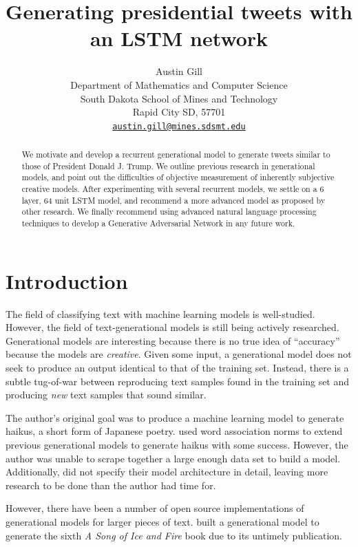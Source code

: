 \documentclass[letterpaper]{article}
\title{Generating presidential tweets with an LSTM network}
\author{%
    Austin Gill\\
    Department of Mathematics and Computer Science\\
    South Dakota School of Mines and Technology\\
    Rapid City SD, 57701\\
    \texttt{\href{mailto:austin.gill@mines.sdsmt.edu}{austin.gill@mines.sdsmt.edu}}\\
}
\begin{document}
\maketitle

\begin{abstract}
    We motivate and develop a recurrent generational model to generate tweets similar to those of President Donald J. Trump. We outline previous research in generational models, and point out the difficulties of objective measurement of inherently subjective creative models. After experimenting with several recurrent models, we settle on a 6 layer, 64 unit LSTM model, and recommend a more advanced model as proposed by other research. We finally recommend using advanced natural language processing techniques to develop a Generative Adversarial Network in any future work.
\end{abstract}

\section{Introduction}
    The field of classifying text with machine learning models is well-studied. However, the field of text-generational models is still being actively researched. Generational models are interesting because there is no true idea of ``accuracy'' because the models are \textit{creative}. Given some input, a generational model does not seek to produce an output identical to that of the training set. Instead, there is a subtle tug-of-war between reproducing text samples found in the training set and producing \textit{new} text samples that sound similar.

    The author's original goal was to produce a machine learning model to generate haikus, a short form of Japanese poetry. \citet{yael_2010} used word association norms to extend previous generational models to generate haikus with some success. However, the author was unable to scrape together a large enough data set to build a model. Additionally, \citet{yael_2010} did not specify their model architecture in detail, leaving more research to be done than the author had time for.

    However, there have been a number of open source implementations of generational models for larger pieces of text. \citet{thoutt_2017} built a generational model to generate the sixth \textit{A Song of Ice and Fire} \citep{martin} book due to its untimely publication.
\end{document}
